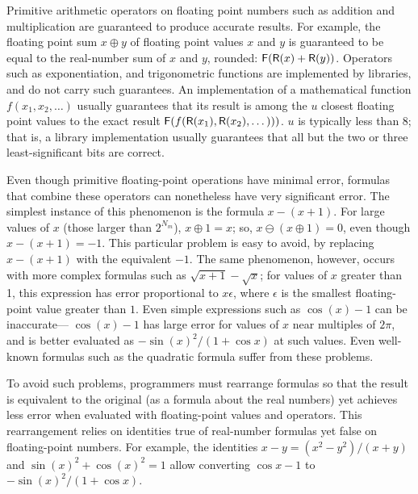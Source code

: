 \documentclass{paper.tex}[subfiles]
\begin{document}
Primitive arithmetic operators on floating point numbers
  such as addition and multiplication
  are guaranteed to produce accurate results.
For example, the floating point sum
  $x \oplus y$ of floating point values $x$ and $y$
  is guaranteed to be equal to the real-number sum
  of $x$ and $y$, rounded: $\mathsf{F}(\mathsf{R}(x) + \mathsf{R}(y))$.
Operators such as exponentiation, and trigonometric functions
  are implemented by libraries, and do not carry such guarantees.
An implementation of a mathematical function $f(x_1, x_2, \dotsc)$
  usually guarantees that its result
  is among the $u$ closest floating point values
  to the exact result $\mathsf{F}(f(\mathsf{R}(x_1), \mathsf{R}(x_2), \dotsc)))$.
$u$ is typically less than 8; that is,
  a library implementation usually guarantees that all
  but the two or three least-significant bits are correct.

\subtitle{Floating point precision problems}

Even though primitive floating-point operations have minimal error,
  formulas that combine these operators can nonetheless
  have very significant error.
The simplest instance of this phenomenon is the formula $x - (x + 1)$.
For large values of $x$ (those larger than $2^{N_m}$), $x \oplus 1 = x$;
  so, $x \ominus (x \oplus 1) = 0$, even though $x - (x + 1) = -1$.
This particular problem is easy to avoid, by replacing $x - (x + 1)$
  with the equivalent $-1$.
The same phenomenon, however, occurs with more complex formulas
  such as $\sqrt{x+1} - \sqrt{x}$;
  for values of $x$ greater than 1, this expression
  has error proportional to $x \epsilon$,
  where $\epsilon$ is the smallest floating-point value
  greater than $1$.
Even simple expressions such as $\cos(x) - 1$ can be inaccurate---%
  $\cos(x) - 1$ has large error for values of $x$ near multiples of $2\pi$,
  and is better evaluated as $-\sin(x)^2 / (1 + \cos x)$ at such values.
Even well-known formulas such as the quadratic formula
  suffer from these problems.

To avoid such problems, programmers must rearrange formulas
  so that the result is equivalent to the original
  (as a formula about the real numbers)
  yet achieves less error when evaluated
  with floating-point values and operators.
This rearrangement relies on identities
  true of real-number formulas yet false on floating-point numbers.
For example, the identities $x - y = (x^2 - y^2) / (x + y)$
  and $\sin(x)^2 + \cos(x)^2 = 1$
  allow converting $\cos x - 1$ to $- \sin(x)^2 / (1 + \cos x)$.
\end{document}
